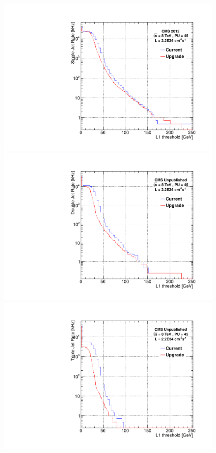 \begin{figure}[t!]
\begin{center}
  \includegraphics[scale=0.3]{Figures/l1jets/singleJetRates_2e34.pdf}
   \includegraphics[scale=0.3]{Figures/l1jets/doubJetRates_2e34.pdf}
   \includegraphics[scale=0.3]{Figures/l1jets/tripJetRates_2e34.pdf}

\end{center}
\end{figure}
